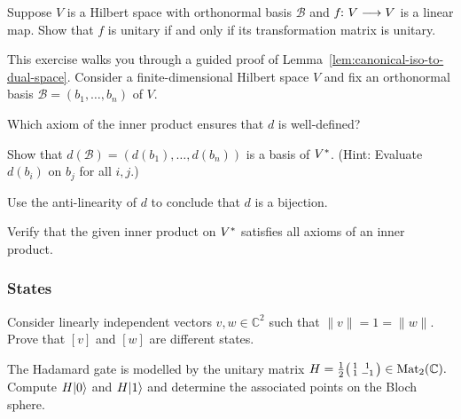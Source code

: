 \documentclass[a4paper, oneside, 12pt]{amsart}
\begin{document}
\begin{exercise}\label{exe:unitary-matrix-unitary-map}
  Suppose \(V\) is a Hilbert space with orthonormal basis \(\mathcal{B}\) and \(f\from V\to V\) is a linear map.
  Show that \(f\) is unitary if and only if its transformation matrix is unitary.
\end{exercise}

\begin{exercise}\label{exe:proof-of-lem-canonical-iso-to-dual-space}
  This exercise walks you through a guided proof of Lemma~\ref{lem:canonical-iso-to-dual-space}.
  Consider a finite-dimensional Hilbert space \( V \) and fix an orthonormal basis \( \mathcal{B} = (b_1, \dots, b_n) \) of \( V \).
  \begin{thmlist}
    \item Which axiom of the inner product ensures that \( d \) is well-defined?
    \item Show that \( d(\mathcal{B}) = ( d(b_1), \dots, d(b_n)) \) is a basis of \( \rd*{V}\).
    (Hint: Evaluate \( d(b_i) \) on \( b_j \) for all \( i, j \).)
    \item Use the anti-linearity of \( d \) to conclude that \( d \) is a bijection.
    \item Verify that the given inner product on \( \rd*{V} \) satisfies all axioms of an inner product.
  \end{thmlist}
\end{exercise}

\subsubsection*{States}

\begin{exercise}
  Consider linearly independent vectors \(v, w \in \mathbb{C}^{2}\) such that \( \|v \| = 1 = \|w\|\).
  Prove that \([v]\) and \([w]\) are different states.
\end{exercise}


\begin{exercise}
  The Hadamard gate is modelled by the unitary matrix \(H= \tfrac{1}{2}
  \begin{psmallmatrix}
    1 & 1 \\ 1 & -1
  \end{psmallmatrix} \in \operatorname{Mat}_{2}( \mathbb{C}).
  \)
  Compute \(H\lvert0\rangle\) and \(H \lvert1\rangle\) and determine the associated points on the Bloch sphere.
\end{exercise}
\end{document}
